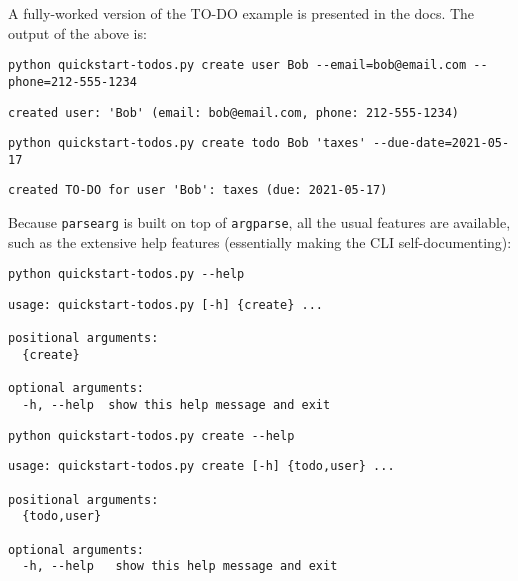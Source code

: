 \documentclass[10pt]{amsart}
\numberwithin{equation}{section}
\begin{document}
A fully-worked version of the TO-DO example is presented in the docs. The output
of the above is:
\begin{verbatim}
python quickstart-todos.py create user Bob --email=bob@email.com --phone=212-555-1234
\end{verbatim}

\begin{verbatim}
created user: 'Bob' (email: bob@email.com, phone: 212-555-1234)
\end{verbatim}


\begin{verbatim}
python quickstart-todos.py create todo Bob 'taxes' --due-date=2021-05-17
\end{verbatim}

\begin{verbatim}
created TO-DO for user 'Bob': taxes (due: 2021-05-17)
\end{verbatim}


Because \texttt{parsearg} is built on top of \texttt{argparse}, all the usual features
are available, such as the extensive help features (essentially
making the CLI self-documenting):
\begin{verbatim}
python quickstart-todos.py --help
\end{verbatim}

\begin{verbatim}
usage: quickstart-todos.py [-h] {create} ...

positional arguments:
  {create}

optional arguments:
  -h, --help  show this help message and exit
\end{verbatim}



\begin{verbatim}
python quickstart-todos.py create --help
\end{verbatim}

\begin{verbatim}
usage: quickstart-todos.py create [-h] {todo,user} ...

positional arguments:
  {todo,user}

optional arguments:
  -h, --help   show this help message and exit
\end{verbatim}
\end{document}
